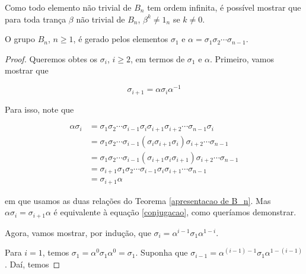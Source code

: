 	\begin{remark}
		Como todo elemento não trivial de $B_n$ tem ordem infinita, é possível mostrar que para toda trança $\beta$ não trivial de $B_n$, $\beta^k\neq 1_n$ se $k\neq 0$.
	\end{remark}
	
	\begin{prop}
		\label{sigma1 e alfa geram B_n}
		O grupo $B_n$, $n\geq 1$, é gerado pelos elementos $\sigma_1$ e $\alpha = \sigma_1\sigma_2\cdots\sigma_{n-1}$.
	\end{prop}
	
	\begin{proof}
		Queremos obtes os $\sigma_i$, $i\geq 2$, em termos de $\sigma_1$ e $\alpha$. Primeiro, vamos mostrar que 
		
		\begin{equation}
		\label{conjugacao}
		\sigma_{i+1} = \alpha\sigma_i\alpha^{-1}
		\end{equation} 
		
		\par\vspace{0.3cm} Para isso, note que 
		
		\begin{align*}
		\alpha\sigma_i &= \sigma_1\sigma_2\cdots\sigma_{i-1}\sigma_i\sigma_{i+1}\sigma_{i+2}\cdots\sigma_{n-1}\sigma_i \\ 
		&=\sigma_1\sigma_2\cdots\sigma_{i-1}(\sigma_{i}\sigma_{i+1}\sigma_i)\sigma_{i+2}\cdots\sigma_{n-1}  \\
		&= \sigma_1\sigma_2\cdots\sigma_{i-1}(\sigma_{i+1}\sigma_i\sigma_{i+1})\sigma_{i+2}\cdots\sigma_{n-1} \\
		&= \sigma_{i+1}\sigma_1\sigma_2\cdots\sigma_{i-1}\sigma_i\sigma_{i+1}\cdots\sigma_{n-1} \\
		&= \sigma_{i+1}\alpha
		\end{align*}
		
		\par\vspace{0.3cm} em que usamos as duas relações do Teorema \eqref{apresentacao de B_n}. Mas $\alpha\sigma_i = \sigma_{i+1}\alpha$ é equivalente à equação \eqref{conjugacao}, como queríamos demonstrar.
		
		\par\vspace{0.3cm} Agora, vamos mostrar, por indução, que $\sigma_i = \alpha^{i-1}\sigma_1\alpha^{1-i}$. 
		
		\par\vspace{0.3cm} Para $i=1$, temos $\sigma_1 = \alpha^0\sigma_1\alpha^0 = \sigma_1$. Suponha que $\sigma_{i-1} = \alpha^{(i-1)-1}\sigma_1\alpha^{1-(i-1)}$. Daí, temos
		

\end{proof}
